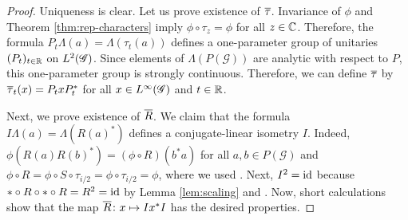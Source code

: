 \begin{proof}
  Uniqueness is clear.  Let us prove existence of $\overline{\tau}$.
  Invariance of $\phi$ and Theorem \ref{thm:rep-characters} imply $\phi \circ
  \tau_{z} = \phi$ for all $z\in \mathbb{C}$. Therefore, the formula
  $P_{t}\Lambda(a) = \Lambda(\tau_{t}(a))$ defines a one-parameter
  group of unitaries $(P_{t})_{t\in \mathbb{R}}$ on $L^{2}(\mathscr{G})$. Since  elements of $\Lambda(P(\mathscr{G}))$ are analytic with
  respect to $P$, this one-parameter group is strongly
  continuous.  Therefore, we can define $\overline{\tau}$ by  $\overline{\tau}_{t}(x)=
  P_{t}xP_{t}^{*}$ for all $x\in L^{\infty}(\mathscr{G})$ and $t\in \mathbb{R}$.
  

  Next, we prove existence of $\overline{R}$. We claim that the formula $
  I\Lambda(a) = \Lambda(R(a)^{*})$ defines a conjugate-linear   isometry $I$. Indeed, $\phi(R(a)R(b)^{*})= (\phi\circ R)(b^{*}a)$
  for all $a,b\in P(\mathscr{G})$ and $\phi \circ R=\phi \circ S \circ
  \tau_{i/2} = \phi \circ \tau_{i/2}=\phi$, where we used \cite[
  Corollary 2.20]{DCT1}. Next, $I^{2} = \operatorname{id}$ because $*\circ R \circ *
  \circ R= R^{2}=\operatorname{id}$ by Lemma \ref{lem:scaling} and \cite[Proposition 1.17]{DCT1}. Now, short calculations show that the map $\overline{R} \colon
  x \mapsto Ix^{*}I$ has the desired properties.


\end{proof}
